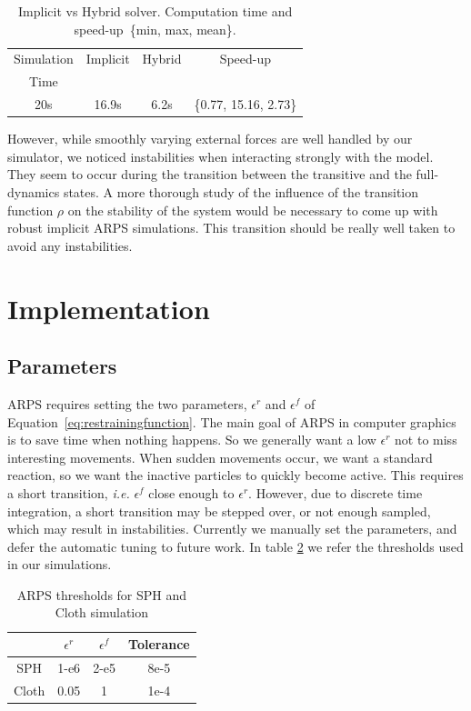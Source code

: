 \begin{table}[!h]
	\centering
	\begin{tabular}{|c|c|c|c|} \hline
		Simulation & Implicit  & Hybrid    & Speed-up \\
		Time & & & \\ \hline
		20s             & 16.9s     & 6.2s      &  \{0.77, 15.16, 2.73\}\\ \hline
	\end{tabular}
	\caption[ARPS: Implicit vs. Hybrid solver - Measurements]{\label{tab:clothePerf}Implicit vs Hybrid solver. Computation time and speed-up~\small{\{min, max, mean\}.}}
\end{table}

However, while smoothly varying external forces are well handled by our simulator, we noticed instabilities when interacting strongly with the model.
They seem to occur during the transition between the transitive and the full-dynamics states.
A more thorough study of the influence of the transition function $\rho$ on the stability of the system would be necessary to come up with robust implicit ARPS simulations.
 This transition should be really well taken to avoid any instabilities.

\section{Implementation} 
\label{sec:arps_implementation}

\subsection{ Parameters }
ARPS requires setting the two parameters, $\epsilon^{r}$ and $\epsilon^{f}$ of Equation~\ref{eq:restrainingfunction}.
The main goal of ARPS in computer graphics is to save time when nothing happens.
So we generally want a low $\epsilon^{r}$ not to miss interesting movements.
When sudden movements occur, we want a standard reaction, so we want the inactive particles to quickly become active.
This requires a short transition, \textit{i.e.} $\epsilon^{f}$ close enough to $\epsilon^{r}$.
However, due to discrete time integration, a short transition may be stepped over, or not enough sampled, which may result in instabilities.
Currently we manually set the parameters, and defer the automatic tuning to future work.
In table \ref{tab:parameters} we refer the thresholds used in our simulations.

\begin{table}[!h]
    \centering
    \begin{tabular}{|c|c|c|c|} \hline
                & $\epsilon^{r}$    & $\epsilon^{f}$ & Tolerance \\ \hline
        SPH     &   1-e6            & 2-e5          & 8e-5 \\ \hline
        Cloth  &   0.05            & 1             & 1e-4 \\ \hline
\end{tabular}
    \caption[ARPS: Parameters for ARPS solver]{\label{tab:parameters} ARPS thresholds for SPH and Cloth simulation}
\end{table}

